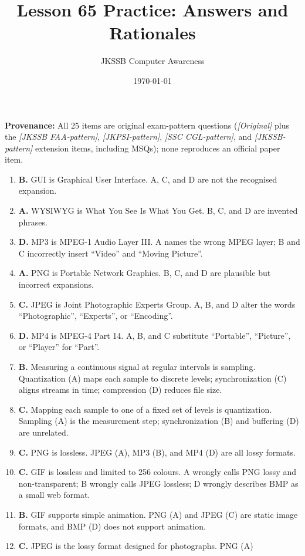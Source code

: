 \documentclass[11pt]{article}
\title{Lesson 65 Practice: Answers and Rationales}
\author{JKSSB Computer Awareness}
\date{\today}
\begin{document}
\maketitle
\noindent\textbf{Provenance:} All 25 items are original exam-pattern questions (\textit{[Original]} plus the \textit{[JKSSB FAA-pattern]}, \textit{[JKPSI-pattern]}, \textit{[SSC CGL-pattern]}, and \textit{[JKSSB-pattern]} extension items, including MSQs); none reproduces an official paper item.
\begin{enumerate}[label=\textbf{Q\arabic*.}, leftmargin=*]
\item \textbf{B.} GUI is Graphical User Interface. A, C, and D are not the
  recognised expansion.
\item \textbf{A.} WYSIWYG is What You See Is What You Get. B, C, and D are
  invented phrases.
\item \textbf{D.} MP3 is MPEG-1 Audio Layer III. A names the wrong MPEG layer;
  B and C incorrectly insert ``Video'' and ``Moving Picture''.
\item \textbf{A.} PNG is Portable Network Graphics. B, C, and D are plausible
  but incorrect expansions.
\item \textbf{C.} JPEG is Joint Photographic Experts Group. A, B, and D alter
  the words ``Photographic'', ``Experts'', or ``Encoding''.
\item \textbf{D.} MP4 is MPEG-4 Part 14. A, B, and C substitute ``Portable'',
  ``Picture'', or ``Player'' for ``Part''.
\item \textbf{B.} Measuring a continuous signal at regular intervals is
  sampling. Quantization (A) maps each sample to discrete levels;
  synchronization (C) aligns streams in time; compression (D) reduces file
  size.
\item \textbf{C.} Mapping each sample to one of a fixed set of levels is
  quantization. Sampling (A) is the measurement step; synchronization (B) and
  buffering (D) are unrelated.
\item \textbf{C.} PNG is lossless. JPEG (A), MP3 (B), and MP4 (D) are all lossy
  formats.
\item \textbf{C.} GIF is lossless and limited to 256 colours. A wrongly calls
  PNG lossy and non-transparent; B wrongly calls JPEG lossless; D wrongly
  describes BMP as a small web format.
\item \textbf{B.} GIF supports simple animation. PNG (A) and JPEG (C) are
  static image formats, and BMP (D) does not support animation.
\item \textbf{C.} JPEG is the lossy format designed for photographs. PNG (A)

\end{enumerate}
\end{document}
